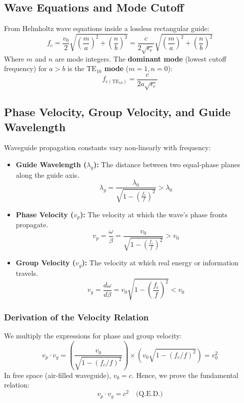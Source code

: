 \documentclass[12pt,a4paper]{article}
\begin{document}
\subsection{Wave Equations and Mode Cutoff}
From Helmholtz wave equations inside a lossless rectangular guide:
\begin{equation}
  f_c = \frac{v_0}{2} \sqrt{\left(\frac{m}{a}\right)^{\!2} + \left(\frac{n}{b}\right)^{\!2}} = \frac{c}{2\sqrt{\epsilon_r}} \sqrt{\left(\frac{m}{a}\right)^{\!2} + \left(\frac{n}{b}\right)^{\!2}}
\end{equation}
Where $m$ and $n$ are mode integers. The \textbf{dominant mode} (lowest cutoff frequency) for $a > b$ is the \textbf{$\text{TE}_{10}$ mode} ($m=1, n=0$):
\begin{equation}
  f_{c(\text{TE}_{10})} = \frac{c}{2a\sqrt{\epsilon_r}}
\end{equation}

\subsection{Phase Velocity, Group Velocity, and Guide Wavelength}
Waveguide propagation constants vary non-linearly with frequency:
\begin{itemize}[leftmargin=*, itemsep=3pt]
  \item \textbf{Guide Wavelength ($\lambda_g$):} The distance between two equal-phase planes along the guide axis.
    \begin{equation}
      \lambda_g = \frac{\lambda_0}{\sqrt{1 - \left(\frac{f_c}{f}\right)^{\!2}}} > \lambda_0
    \end{equation}
  \item \textbf{Phase Velocity ($v_p$):} The velocity at which the wave's phase fronts propagate.
    \begin{equation}
      v_p = \frac{\omega}{\beta} = \frac{v_0}{\sqrt{1 - \left(\frac{f_c}{f}\right)^{\!2}}} > v_0
    \end{equation}
  \item \textbf{Group Velocity ($v_g$):} The velocity at which real energy or information travels.
    \begin{equation}
      v_g = \frac{d\omega}{d\beta} = v_0 \sqrt{1 - \left(\frac{f_c}{f}\right)^{\!2}} < v_0
    \end{equation}
\end{itemize}

\subsubsection{Derivation of the Velocity Relation}
We multiply the expressions for phase and group velocity:
\begin{equation*}
  v_p \cdot v_g = \left( \frac{v_0}{\sqrt{1 - (f_c/f)^2}} \right) \times \left( v_0 \sqrt{1 - (f_c/f)^2} \right) = v_0^2
\end{equation*}
In free space (air-filled waveguide), $v_0 = c$. Hence, we prove the fundamental relation:
\begin{equation}
  v_p \cdot v_g = c^2 \quad \text{(Q.E.D.)}
\end{equation}
\end{document}
